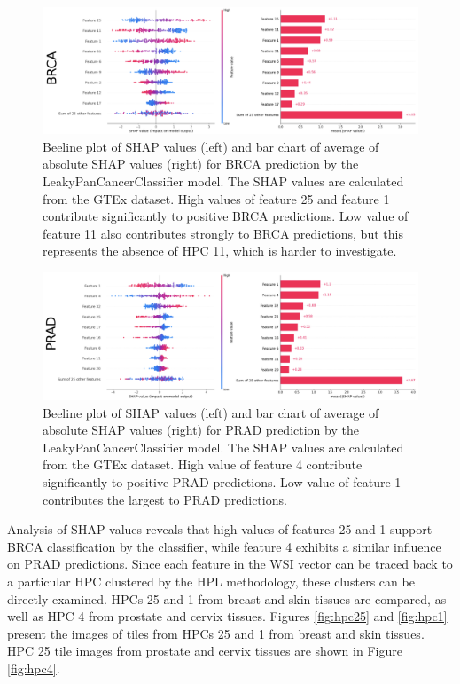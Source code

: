 \documentclass{l4proj}
\begin{document}
\begin{figure}[h]
    \centering
    \includegraphics[width=1\linewidth]{images/brca-shap.png}
    \caption{Beeline plot of SHAP values (left) and bar chart of average of absolute SHAP values (right) for BRCA prediction by the LeakyPanCancerClassifier model. The SHAP values are calculated from the GTEx dataset. High values of feature 25 and feature 1 contribute significantly to positive BRCA predictions. Low value of feature 11 also contributes strongly to BRCA predictions, but this represents the absence of HPC 11, which is harder to investigate.}
    \label{fig:shap-brca}
\end{figure}

\begin{figure}[h]
    \centering
    \includegraphics[width=1\linewidth]{images/prad-shap.png}
    \caption{Beeline plot of SHAP values (left) and bar chart of average of absolute SHAP values (right) for PRAD prediction by the LeakyPanCancerClassifier model. The SHAP values are calculated from the GTEx dataset. High value of feature 4 contribute significantly to positive PRAD predictions. Low value of feature 1 contributes the largest to PRAD predictions.}
    \label{fig:shap-prad}
\end{figure}

Analysis of SHAP values reveals that high values of features 25 and 1 support BRCA classification by the classifier, while feature 4 exhibits a similar influence on PRAD predictions. Since each feature in the WSI vector can be traced back to a particular HPC clustered by the HPL methodology, these clusters can be directly examined. HPCs 25 and 1 from breast and skin tissues are compared, as well as HPC 4 from prostate and cervix tissues. Figures \ref{fig:hpc25} and \ref{fig:hpc1} present the images of tiles from HPCs 25 and 1 from breast and skin tissues. HPC 25 tile images from prostate and cervix tissues are shown in Figure \ref{fig:hpc4}.
\end{document}
